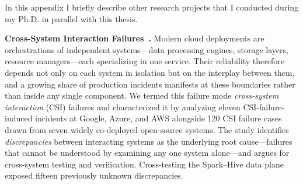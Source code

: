 
In this appendix I briefly describe other research projects that I conducted
during my Ph.D. in parallel with this thesis.

\smallskip\noindent\textbf{Cross-System Interaction Failures~\cite{csi}.} Modern cloud
deployments are orchestrations of independent systems---data processing
engines, storage layers, resource managers---each specializing in one service.
Their reliability therefore depends not only on each system in isolation but on
the interplay between them, and a growing share of production incidents
manifests at these boundaries rather than inside any single component. We
termed this failure mode \emph{cross-system interaction} (CSI) failures and
characterized it by analyzing eleven CSI-failure-induced incidents at Google,
Azure, and AWS alongside 120 CSI failure cases drawn from seven widely
co-deployed open-source systems. The study identifies
\emph{discrepancies} between interacting systems as the underlying root
cause---failures that cannot be understood by examining any one system
alone---and argues for cross-system testing and verification. Cross-testing the
Spark--Hive data plane exposed fifteen previously unknown discrepancies.
